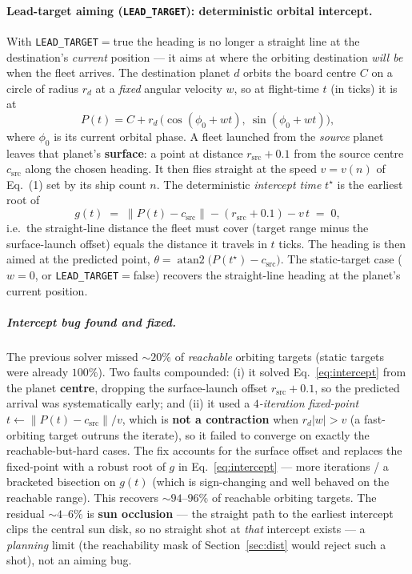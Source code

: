 \documentclass[11pt]{article}
\begin{document}
\paragraph{Lead-target aiming (\texttt{LEAD\_TARGET}): deterministic orbital intercept.}\label{sec:lead}
With \texttt{LEAD\_TARGET}$=$true the heading is no longer a straight line at the destination's
\emph{current} position --- it aims at where the orbiting destination \emph{will be} when the fleet
arrives. The destination planet $d$ orbits the board centre $C$ on a circle of radius $r_d$ at a
\emph{fixed} angular velocity $w$, so at flight-time $t$ (in ticks) it is at
\begin{equation}
P(t) = C + r_d\,\big(\cos(\phi_0 + w t),\ \sin(\phi_0 + w t)\big),
\label{eq:orbit}
\end{equation}
where $\phi_0$ is its current orbital phase. A fleet launched from the \emph{source} planet leaves that
planet's \textbf{surface}: a point at distance $r_{\mathrm{src}}+0.1$ from the source centre
$c_{\mathrm{src}}$ along the chosen heading. It then flies straight at the speed $v=v(n)$ of
Eq.~(1) set by its ship count $n$. The deterministic \emph{intercept time} $t^\star$ is the earliest
root of
\begin{equation}
g(t) \;=\; \big\lVert P(t) - c_{\mathrm{src}}\big\rVert - (r_{\mathrm{src}}+0.1) - v\,t \;=\; 0,
\label{eq:intercept}
\end{equation}
i.e.\ the straight-line distance the fleet must cover (target range minus the surface-launch offset)
equals the distance it travels in $t$ ticks. The heading is then aimed at the predicted point,
$\theta=\operatorname{atan2}\big(P(t^\star)-c_{\mathrm{src}}\big)$. The static-target case
($w=0$, or \texttt{LEAD\_TARGET}$=$false) recovers the straight-line heading at the planet's current
position.

\subparagraph{Intercept bug found and fixed.} The previous solver missed ${\sim}20\%$ of
\emph{reachable} orbiting targets (static targets were already $100\%$). Two faults compounded:
(i) it solved Eq.~\eqref{eq:intercept} from the planet \textbf{centre}, dropping the surface-launch
offset $r_{\mathrm{src}}+0.1$, so the predicted arrival was systematically early; and (ii) it used a
\emph{$4$-iteration fixed-point} $t\leftarrow \lVert P(t)-c_{\mathrm{src}}\rVert/v$, which is
\textbf{not a contraction} when $r_d\lvert w\rvert > v$ (a fast-orbiting target outruns the iterate),
so it failed to converge on exactly the reachable-but-hard cases. The fix accounts for the surface
offset and replaces the fixed-point with a robust root of $g$ in Eq.~\eqref{eq:intercept} --- more
iterations / a bracketed bisection on $g(t)$ (which is sign-changing and well behaved on the reachable
range). This recovers ${\sim}94$--$96\%$ of reachable orbiting targets. The residual ${\sim}4$--$6\%$
is \textbf{sun occlusion} --- the straight path to the earliest intercept clips the central sun disk,
so no straight shot at \emph{that} intercept exists --- a \emph{planning} limit (the reachability mask
of Section~\ref{sec:dist} would reject such a shot), not an aiming bug.
\end{document}
